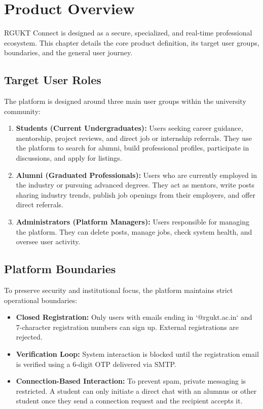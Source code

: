\chapter{Product Overview}
\label{ch:product_overview}

RGUKT Connect is designed as a secure, specialized, and real-time professional ecosystem. This chapter details the core product definition, its target user groups, boundaries, and the general user journey.

\section{Target User Roles}
The platform is designed around three main user groups within the university community:
\begin{enumerate}
    \item \textbf{Students (Current Undergraduates):} Users seeking career guidance, mentorship, project reviews, and direct job or internship referrals. They use the platform to search for alumni, build professional profiles, participate in discussions, and apply for listings.
    \item \textbf{Alumni (Graduated Professionals):} Users who are currently employed in the industry or pursuing advanced degrees. They act as mentors, write posts sharing industry trends, publish job openings from their employers, and offer direct referrals.
    \item \textbf{Administrators (Platform Managers):} Users responsible for managing the platform. They can delete posts, manage jobs, check system health, and oversee user activity.
\end{enumerate}

\section{Platform Boundaries}
To preserve security and institutional focus, the platform maintains strict operational boundaries:
\begin{itemize}
    \item \textbf{Closed Registration:} Only users with emails ending in `@rgukt.ac.in` and 7-character registration numbers can sign up. External registrations are rejected.
    \item \textbf{Verification Loop:} System interaction is blocked until the registration email is verified using a 6-digit OTP delivered via SMTP.
    \item \textbf{Connection-Based Interaction:} To prevent spam, private messaging is restricted. A student can only initiate a direct chat with an alumnus or other student once they send a connection request and the recipient accepts it.
\end{itemize}

